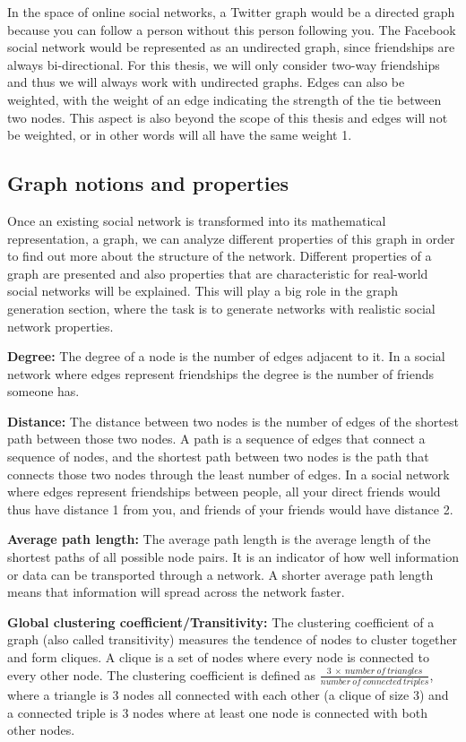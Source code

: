 In the space of online social networks, a Twitter graph would be a directed graph because you can follow a person without this person following you. The Facebook social network would be represented as an undirected graph, since friendships are always bi-directional. For this thesis, we will only consider two-way friendships and thus we will always work with undirected graphs. Edges can also be weighted, with the weight of an edge indicating the strength of the tie between two nodes. This aspect is also beyond the scope of this thesis and edges will not be weighted, or in other words will all have the same weight 1.

\subsection{Graph notions and properties}
\label{sst:graphproperties} Once an existing social network is transformed into its mathematical representation, a graph, we can analyze different properties of this graph in order to find out more about the structure of the network. Different properties of a graph are presented and also properties that are characteristic for real-world social networks will be explained. This will play a big role in the graph generation section, where the task is to generate networks with realistic social network properties.

\textbf{Degree:} The degree of a node is the number of edges adjacent to it. In a social network where edges represent friendships the degree is the number of friends someone has.

\textbf{Distance:} The distance between two nodes is the number of edges of the shortest path between those two nodes. A path is a sequence of edges that connect a sequence of nodes, and the shortest path between two nodes is the path that connects those two nodes through the least number of edges. In a social network where edges represent friendships between people, all your direct friends would thus have distance 1 from you, and friends of your friends would have distance 2.

\textbf{Average path length:} The average path length is the average length of the shortest paths of all possible node pairs. It is an indicator of how well information or data can be transported through a network. A shorter average path length means that information will spread across the network faster.

\textbf{Global clustering coefficient/Transitivity:} The clustering coefficient of a graph (also called transitivity) measures the tendence of nodes to cluster together and form cliques. A clique is a set of nodes where every node is connected to every other node. The clustering coefficient is defined as $\frac{3\:\times\:number\:of\:triangles}{number\:of\:connected\:triples}$, where a triangle is 3 nodes all connected with each other (a clique of size 3) and a connected triple is 3 nodes where at least one node is connected with both other nodes.

